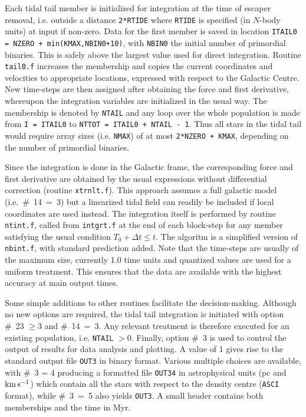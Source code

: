 \documentclass[12pt]{article}
\begin{document}
Each tidal tail member is initialized for integration at the time of
escaper removal, i.e. outside a distance {\tt 2*RTIDE} where {\tt RTIDE}
is specified (in $N$-body units) at input if non-zero.
Data for the first member is saved in location
{\tt ITAIL0 = NZERO + {\rm min}(KMAX,NBIN0+10)}, with {\tt NBIN0} the
initial number of primordial binaries.
This is safely above the largest value used for direct integration.
Routine {\tt tail0.f} increases the membership and copies the current
coordinates and velocities to appropriate locations, expressed with
respect to the Galactic Centre.
New time-steps are then assigned after obtaining the force and first
derivative, whereupon the integration variables are initialized in the
usual way.
The membership is denoted by {\tt NTAIL} and any loop over the whole
population is made from {\tt I = ITAIL0} to
{\tt NTTOT = ITAIL0 + NTAIL - 1}.
Thus all stars in the tidal tail would require array sizes
(i.e. {\tt NMAX}) of at most {\tt 2*NZERO + KMAX}, depending on the number
of primordial binaries.

Since the integration is done in the Galactic frame, the corresponding
force and first derivative are obtained by the usual expressions without
differential correction (routine {\tt xtrnlt.f}).
This approach assumes a full galactic model (i.e.~\#~14~=~3) but a
linearized tidal field can readily be included if local coordinates are
used instead.
The integration itself is performed by routine {\tt ntint.f}, called from
{\tt intgrt.f} at the end of each block-step for any member satisfying
the usual condition $T_0 + \Delta t \le t$.
The algoritm is a simplified version of {\tt nbint.f}, with standard
prediction added.
Note that the time-steps are usually of the maximum size, currently 1.0
time units and quantized values are used for a uniform treatment.
This ensures that the data are available with the highest accuracy at main
output times.

Some simple additions to other routines facilitate the decision-making.
Although no new options are required, the tidal tail integration is
initiated with option \#~23 $\ge 3$ and \#~14~=~3.
Any relevant treatment is therefore executed for an existing population,
i.e. {\tt NTAIL} $> 0$.
Finally, option \#~3 is used to control the output of results for data
analysis and plotting.
A value of 1 gives rise to the standard output file {\tt OUT3} in binary
format.
Various multiple choices are available, with \#~3 = 4 producing a formatted
file {\tt OUT34} in astrophysical units (pc and ${\rm km}\,{\rm s}^{-1}$) which contain all
the stars with respect to the density centre ({\tt ASCI} format), while
\#~3~=~5 also yields {\tt OUT3}.
A small header contains both memberships and the time in Myr.
\end{document}
